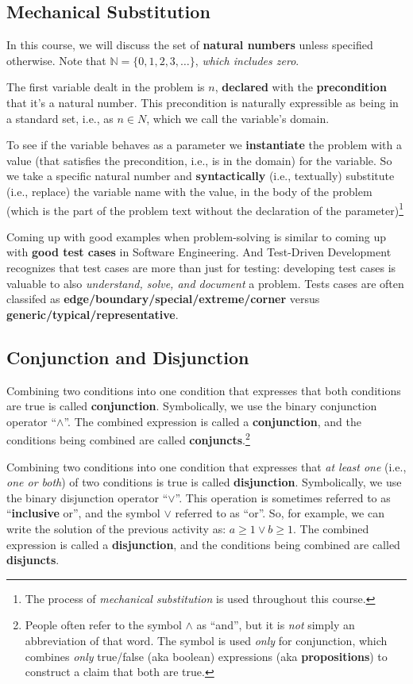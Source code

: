 \documentclass{article}
\begin{document}
\subsection{Mechanical Substitution}
In this course, we will discuss the set of \textbf{natural numbers} unless specified otherwise. Note that $\mathbb{N} = \{0,1,2,3,\dots\}$, \textit{which includes zero}.

The first variable dealt in the problem is $n$, \textbf{declared} with the \textbf{precondition} that it’s a natural
number. This precondition is naturally expressible as being in a standard set, i.e., as $n \in N$, which we call the variable’s domain.

To see if the variable behaves as a parameter we \textbf{instantiate} the problem with a value (that satisfies the precondition, i.e., is in
the domain) for the variable. So we take a specific natural number and \textbf{syntactically} (i.e., textually) substitute (i.e., replace) the
variable name with the value, in the body of the problem (which is the part of the problem text without the declaration of the
parameter)\footnote{The process of \textit{mechanical substitution} is used throughout this course.}

Coming up with good examples when problem-solving is similar to coming up with \textbf{good test cases} in Software Engineering. And Test-Driven Development recognizes that test cases are more than just for testing: developing test cases is valuable to also
\textit{understand, solve, and document} a problem. Tests cases are often classifed as \textbf{edge/boundary/special/extreme/corner} versus \textbf{generic/typical/representative}.

\subsection{Conjunction and Disjunction}
Combining two conditions into one condition that expresses that both conditions are true is called \textbf{conjunction}. Symbolically, we use the binary conjunction operator “$\wedge$”. The combined expression is called a \textbf{conjunction}, and the conditions being combined are called \textbf{conjuncts}.\footnote{People often refer to the symbol $\wedge$ as “and”, but it is \textit{not} simply an abbreviation of that word. The symbol is used \textit{only} for
conjunction, which combines \textit{only} true/false (aka boolean) expressions (aka \textbf{propositions}) to construct a claim that both are true.}

Combining two conditions into one condition that expresses that \textit{at least one} (i.e., \textit{one or both}) of two conditions is true is called
\textbf{disjunction}. Symbolically, we use the binary disjunction operator “$\vee$”. This operation is sometimes referred to as “\textbf{inclusive}
or”, and the symbol $\vee$ referred to as “or”.
So, for example, we can write the solution of the previous activity as: $a \geq 1 \vee b \geq 1$. The combined expression is called a
\textbf{disjunction}, and the conditions being combined are called \textbf{disjuncts}.
\end{document}
